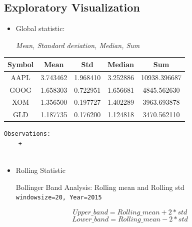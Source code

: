 \documentclass[11pt]{article}
\begin{document}
\subsection{Exploratory Visualization}\label{exploratory-visualization}

\begin{itemize}
\item
  Global statistic:

  \emph{Mean, Standard deviation, Median, Sum}
\end{itemize}

\begin{longtable}[]{@{}ccccc@{}}
\toprule
\textbf{Symbol} & \textbf{Mean} & \textbf{Std} & \textbf{Median} &
\textbf{Sum}\tabularnewline
\midrule
\endhead
AAPL & 3.743462 & 1.968410 & 3.252886 & 10938.396687\tabularnewline
GOOG & 1.658303 & 0.722951 & 1.656681 & 4845.562630\tabularnewline
XOM & 1.356500 & 0.197727 & 1.402289 & 3963.693878\tabularnewline
GLD & 1.187735 & 0.176200 & 1.124818 & 3470.562110\tabularnewline
\bottomrule
\end{longtable}

\begin{verbatim}
Observations:
    + 
    
\end{verbatim}

\begin{itemize}
\item
  Rolling Statistic

  Bollinger Band Analysis: Rolling mean and Rolling std
  \texttt{windowsize=20,\ Year=2015}
\end{itemize}

\[ Upper\_band = Rolling\_mean + 2*std \]
\[ Lower\_band = Rolling\_mean - 2*std \]
\end{document}
